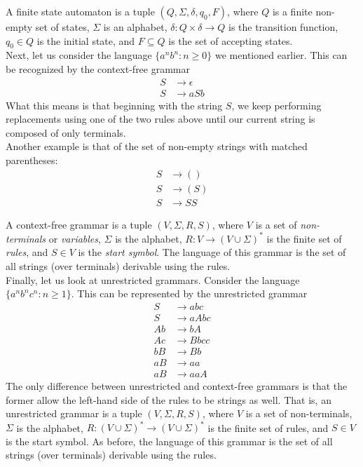 A finite state automaton is a tuple $(Q,\Sigma,\delta,q_0,F)$, where $Q$ is a finite non-empty set of states, $\Sigma$ is an alphabet, $\delta : Q \times \delta \to Q$ is the transition function, $q_0 \in Q$ is the initial state, and $F \subseteq Q$ is the set of accepting states.\\

Next, let us consider the language $\{a^nb^n : n \ge 0\}$ we mentioned earlier. This can be recognized by the context-free grammar
\begin{align*}
	S &\to \epsilon \\
	S &\to aSb
\end{align*}
What this means is that beginning with the string $S$, we keep performing replacements using one of the two rules above until our current string is composed of only terminals.\\
Another example is that of the set of non-empty strings with matched parentheses:
\begin{align*}
	S &\to () \\
	S &\to (S) \\
	S &\to SS
\end{align*}

A context-free grammar is a tuple $(V,\Sigma,R,S)$, where $V$ is a set of \emph{non-terminals} or \emph{variables}, $\Sigma$ is the alphabet, $R : V \to (V \cup \Sigma)^*$ is the finite set of \emph{rules}, and $S \in V$ is the \emph{start symbol}. The language of this grammar is the set of all strings (over terminals) derivable using the rules.\\

Finally, let us look at unrestricted grammars. Consider the language $\{a^nb^nc^n : n \ge 1\}$. This can be represented by the unrestricted grammar
\begin{align*}
	S &\to abc \\
	S &\to aAbc \\
	Ab &\to bA \\
	Ac &\to Bbcc \\
	bB &\to Bb \\
	aB &\to aa \\
	aB &\to aaA
\end{align*}
The only difference between unrestricted and context-free grammars is that the former allow the left-hand side of the rules to be strings as well. That is, an unrestricted grammar is a tuple $(V,\Sigma,R,S)$, where $V$ is a set of non-terminals, $\Sigma$ is the alphabet, $R : (V \cup \Sigma)^* \to (V \cup \Sigma)^*$ is the finite set of rules, and $S \in V$ is the start symbol. As before, the language of this grammar is the set of all strings (over terminals) derivable using the rules.\\